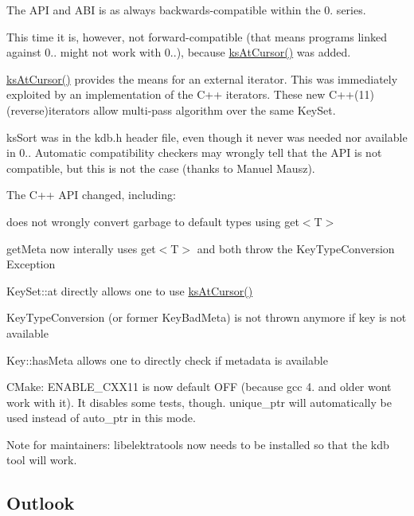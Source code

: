 The A\+PI and A\+BI is as always backwards-\/compatible within the 0. series.

This time it is, however, not forward-\/compatible (that means programs linked against 0.. might not work with 0..), because \hyperlink{group__keyset_ga3604cc41505f7e19db945cece67190b6}{ks\+At\+Cursor()} was added.

\hyperlink{group__keyset_ga3604cc41505f7e19db945cece67190b6}{ks\+At\+Cursor()} provides the means for an external iterator. This was immediately exploited by an implementation of the C++ iterators. These new C++(11) (reverse)iterators allow multi-\/pass algorithm over the same Key\+Set.

ks\+Sort was in the kdb.\+h header file, even though it never was needed nor available in 0.. Automatic compatibility checkers may wrongly tell that the A\+PI is not compatible, but this is not the case (thanks to Manuel Mausz).

The C++ A\+PI changed, including\+:
\begin{DoxyItemize}
\item does not wrongly convert garbage to default types using {\ttfamily get$<$T$>$}
\item get\+Meta now interally uses {\ttfamily get$<$T$>$} and both throw the Key\+Type\+Conversion Exception
\item Key\+Set\+::at directly allows one to use \hyperlink{group__keyset_ga3604cc41505f7e19db945cece67190b6}{ks\+At\+Cursor()}
\item Key\+Type\+Conversion (or former Key\+Bad\+Meta) is not thrown anymore if key is not available
\item Key\+::has\+Meta allows one to directly check if metadata is available
\end{DoxyItemize}

C\+Make\+: E\+N\+A\+B\+L\+E\+\_\+\+C\+X\+X11 is now default O\+FF (because gcc 4. and older won\textquotesingle{}t work with it). It disables some tests, though. unique\+\_\+ptr will automatically be used instead of auto\+\_\+ptr in this mode.

Note for maintainers\+: libelektratools now needs to be installed so that the kdb tool will work.

\subsection*{Outlook}

